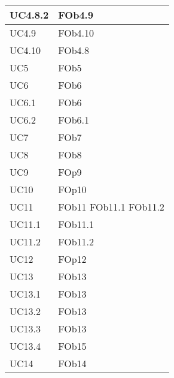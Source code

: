 \begin{longtable}{|l|p{4cm}|}
\hline
		UC4.8.2 & FOb4.9 \linebreak   \\
\hline
		UC4.9 & FOb4.10 \linebreak   \\
\hline
		UC4.10 & FOb4.8 \linebreak   \\
\hline
		UC5 & FOb5 \linebreak   \\
\hline
		UC6 & FOb6 \linebreak   \\
\hline
		UC6.1 & FOb6 \linebreak   \\
\hline
		UC6.2 & FOb6.1 \linebreak   \\
\hline
		UC7 & FOb7 \linebreak   \\
\hline
		UC8 & FOb8 \linebreak   \\
\hline
		UC9 & FOp9 \linebreak   \\
\hline
		UC10 & FOp10 \linebreak   \\
\hline
		UC11 & FOb11 \linebreak  FOb11.1 \linebreak  FOb11.2 \linebreak   \\
\hline
		UC11.1 & FOb11.1 \linebreak   \\
\hline
		UC11.2 & FOb11.2 \linebreak   \\
\hline
		UC12 & FOp12 \linebreak   \\
\hline
		UC13 & FOb13 \linebreak   \\
\hline
		UC13.1 & FOb13 \linebreak   \\
\hline
		UC13.2 & FOb13 \linebreak   \\
\hline
		UC13.3 & FOb13 \linebreak   \\
\hline
		UC13.4 & FOb15 \linebreak   \\
\hline
		UC14 & FOb14 \linebreak   \\

\end{longtable}
